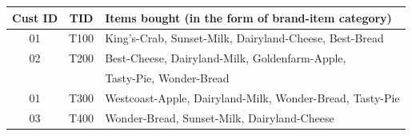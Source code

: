 \begin{center}
	\begin{tabular}{ |c|c|l| } 
		\hline
		Cust ID & TID & Items bought (in the form of brand-item category) \\
		\hline
			01 & T100 & King’s-Crab, Sunset-Milk, Dairyland-Cheese, Best-Bread \\
			02 & T200 & Best-Cheese, Dairyland-Milk, Goldenfarm-Apple, \\
			   &      & Tasty-Pie, Wonder-Bread \\
			01 & T300 & Westcoast-Apple, Dairyland-Milk, Wonder-Bread, Tasty-Pie \\
			03 & T400 & Wonder-Bread, Sunset-Milk, Dairyland-Cheese \\
		\hline
	\end{tabular}
\end{center}

